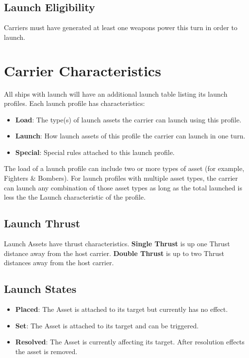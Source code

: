  \subsection{Launch Eligibility}
 Carriers must have generated at least one weapons power this turn in order to launch.

\section{Carrier Characteristics}

All ships with launch will have an additional launch table listing its launch profiles. Each launch profile has characteristics:
\begin{itemize}
	\item \textbf{Load}: The type(s) of launch assets the carrier can launch using this profile.
	\item \textbf{Launch}: How launch assets of this profile the carrier can launch in one turn.
	\item \textbf{Special}: Special rules attached to this launch profile.
\end{itemize}
The load of a launch profile can include two or more types of asset (for example, Fighters \& Bombers). For launch profiles with multiple asset types, the carrier can launch any combination of those asset types as long as the total launched is less the the Launch characteristic of the profile.

\subsection{Launch Thrust}
Launch Assets have thrust characteristics. \textbf{Single Thrust} is up one Thrust distance away from the host carrier. \textbf{Double Thrust} is up to two Thrust distances away from the host carrier.

\subsection{Launch States}
\begin{itemize}
	\item \textbf{Placed}: The Asset is attached to its target but currently has no effect.
	\item \textbf{Set}: The Asset is attached to its target and can be triggered.
	\item \textbf{Resolved}: The Asset is currently affecting its target. After resolution effects the asset is removed.
\end{itemize}


